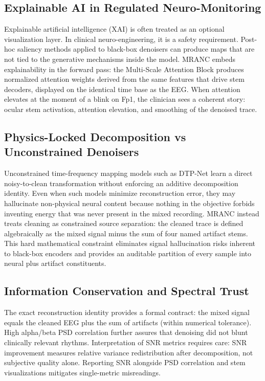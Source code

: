 \documentclass[journal,twocolumn]{IEEEtran}
\begin{document}
\subsection{Explainable AI in Regulated Neuro-Monitoring}
Explainable artificial intelligence (XAI) is often treated as an optional visualization layer. In clinical neuro-engineering, it is a safety requirement. Post-hoc saliency methods applied to black-box denoisers can produce maps that are not tied to the generative mechanisms inside the model. MRANC embeds explainability in the forward pass: the Multi-Scale Attention Block produces normalized attention weights derived from the same features that drive stem decoders, displayed on the identical time base as the EEG. When attention elevates at the moment of a blink on Fp1, the clinician sees a coherent story: ocular stem activation, attention elevation, and smoothing of the denoised trace.

\subsection{Physics-Locked Decomposition vs Unconstrained Denoisers}
Unconstrained time-frequency mapping models such as DTP-Net learn a direct noisy-to-clean transformation without enforcing an additive decomposition identity. Even when such models minimize reconstruction error, they may hallucinate non-physical neural content because nothing in the objective forbids inventing energy that was never present in the mixed recording. MRANC instead treats cleaning as constrained source separation: the cleaned trace is defined algebraically as the mixed signal minus the sum of four named artifact stems. This hard mathematical constraint eliminates signal hallucination risks inherent to black-box encoders and provides an auditable partition of every sample into neural plus artifact constituents.

\subsection{Information Conservation and Spectral Trust}
The exact reconstruction identity provides a formal contract: the mixed signal equals the cleaned EEG plus the sum of artifacts (within numerical tolerance). High alpha/beta PSD correlation further assures that denoising did not blunt clinically relevant rhythms. Interpretation of SNR metrics requires care: SNR improvement measures relative variance redistribution after decomposition, not subjective quality alone. Reporting SNR alongside PSD correlation and stem visualizations mitigates single-metric misreadings.
\end{document}
